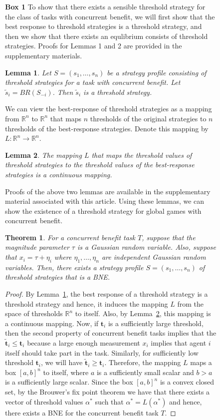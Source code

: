 \documentclass{nature}
\newtheorem{theorem}{Theorem}
\newtheorem{lemma}{Lemma}
\def\R{\mathbb{R}}    %
\def\td{\mathbf{t}}   %
\begin{document}
\nolinenumbers
\begin{figure}
\begin{framed}
\textbf{Box 1}
To show that there exists a sensible threshold strategy for the class of tasks with concurrent benefit, we will first show that the best response to threshold strategies is a threshold strategy, and then we show that there exists an equlibrium consists of threshold strategies\cite{Carlsson1993, Morris2000}. Proofs for Lemmas 1 and 2 are provided in the supplementary materials.
\begin{lemma}\label{lemma:thresholdBR}
Let $S=(s_1,\ldots,s_n)$ be a strategy profile consisting of threshold strategies for a task with  concurrent benefit. Let $\tilde{s}_i=BR(S_{-i})$. Then $\tilde{s}_i$ is a threshold strategy. 
\end{lemma}

We can view the best-response of threshold strategies as a mapping from $\R^n$ to $\R^n$ that maps $n$ thresholds of the original strategies to $n$ thresholds of the best-response strategies. Denote this mapping by $L:\R^n\to\R^n$.
\begin{lemma}\label{lemma:continuous}
The mapping $L$ that maps the threshold values of threshold strategies to the threshold values of the best-response strategies is a continuous mapping. 
\end{lemma}

Proofs of the above two lemmas are available in the supplementary material associated with this article. Using these lemmas, we can show the existence of a threshold strategy for global games with concurrent benefit. 
\begin{theorem}\label{thrm:mainthrm}
For a concurrent benefit task $T$, suppose that the magnitude parameter $\tau$ is a Gaussian random variable. Also, suppose that $x_i=\tau+\eta_i$ where $\eta_1,\ldots,\eta_n$ are independent Gaussian random variables. Then, there exists a strategy profile $S=(s_1,\ldots,s_n)$ of threshold strategies that is a BNE.
\end{theorem}
\begin{proof}
By Lemma~\ref{lemma:thresholdBR}, the best response of a threshold strategy is a threshold strategy and hence, it induces the mapping $L$ from the space of thresholds $\R^n$ to itself. Also, by Lemma~\ref{lemma:continuous}, this mapping is a continuous mapping. Now, if $\td_i$ is a sufficiently large threshold, then the second property of concurrent benefit tasks implies that the $\tilde{\td}_i\leq \td_i$ because a large enough measurement $x_i$ implies that agent $i$ itself should take part in the task. Similarly, for sufficiently low threshold $\td_i$, we will have $\tilde{\td}_i\geq \td_i$. Therefore, the mapping $L$ maps a box $[a,b]^n$ to itself, where $a$ is a sufficiently small scalar and $b>a$ is a sufficiently large scalar. Since the box $[a,b]^n$ is a convex closed set, by the Brouwer's fix point theorem\cite{Border1990} we have that there exists a vector of threshold values $\alpha^*$ such that $\alpha^*=L(\alpha^*)$ and hence, there exists a BNE for the concurrent benefit task $T$.
\end{proof}
\end{framed}
\end{figure}
\end{document}
